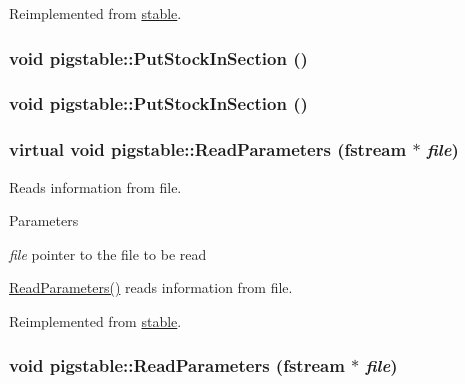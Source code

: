 Reimplemented from \hyperlink{classstable_a2911ffc8041366d46674bf48a6b4d6c5}{stable}.\hypertarget{classpigstable_ab314ba2d59e6a782d7bf8dcd5a367a0a}{
\subsubsection[{PutStockInSection}]{\setlength{\rightskip}{0pt plus 5cm}void pigstable::PutStockInSection ()}}
\label{classpigstable_ab314ba2d59e6a782d7bf8dcd5a367a0a}
\hypertarget{classpigstable_ab314ba2d59e6a782d7bf8dcd5a367a0a}{
\subsubsection[{PutStockInSection}]{\setlength{\rightskip}{0pt plus 5cm}void pigstable::PutStockInSection ()}}
\label{classpigstable_ab314ba2d59e6a782d7bf8dcd5a367a0a}
\hypertarget{classpigstable_aa31308b795d7a454e5156e8c2f49fe47}{
\subsubsection[{ReadParameters}]{\setlength{\rightskip}{0pt plus 5cm}virtual void pigstable::ReadParameters (fstream $\ast$ {\em file})}}
\label{classpigstable_aa31308b795d7a454e5156e8c2f49fe47}


Reads information from file. 
\begin{DoxyParams}{Parameters}
\item[{\em file}]pointer to the file to be read\end{DoxyParams}
\hyperlink{classpigstable_a97e3706555a93da782e5418df532078c}{ReadParameters()} reads information from file. 

Reimplemented from \hyperlink{classstable_ab0195f308a48e008485cf5d04955a741}{stable}.\hypertarget{classpigstable_a97e3706555a93da782e5418df532078c}{
\subsubsection[{ReadParameters}]{\setlength{\rightskip}{0pt plus 5cm}void pigstable::ReadParameters (fstream $\ast$ {\em file})}}
\label{classpigstable_a97e3706555a93da782e5418df532078c}


